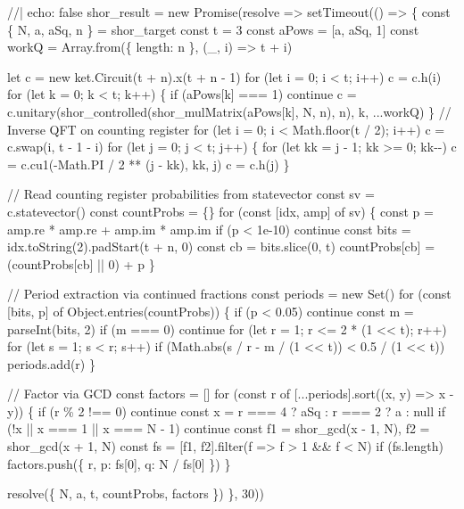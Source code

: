 \documentclass[
  11pt,
  letterpaper,
  oneside]{scrbook}
\newenvironment{Shaded}{\begin{snugshade}}{\end{snugshade}}
\newcommand{\NormalTok}[1]{\textcolor[rgb]{0.00,0.23,0.31}{#1}}
\begin{document}
\begin{Shaded}
\begin{Highlighting}[]
\NormalTok{//| echo: false}
\NormalTok{shor\_result = new Promise(resolve =\textgreater{} setTimeout(() =\textgreater{} \{}
\NormalTok{  const \{ N, a, aSq, n \} = shor\_target}
\NormalTok{  const t = 3}
\NormalTok{  const aPows = [a, aSq, 1]}
\NormalTok{  const workQ = Array.from(\{ length: n \}, (\_, i) =\textgreater{} t + i)}

\NormalTok{  let c = new ket.Circuit(t + n).x(t + n {-} 1)}
\NormalTok{  for (let i = 0; i \textless{} t; i++) c = c.h(i)}
\NormalTok{  for (let k = 0; k \textless{} t; k++) \{}
\NormalTok{    if (aPows[k] === 1) continue}
\NormalTok{    c = c.unitary(shor\_controlled(shor\_mulMatrix(aPows[k], N, n), n), k, ...workQ)}
\NormalTok{  \}}
\NormalTok{  // Inverse QFT on counting register}
\NormalTok{  for (let i = 0; i \textless{} Math.floor(t / 2); i++) c = c.swap(i, t {-} 1 {-} i)}
\NormalTok{  for (let j = 0; j \textless{} t; j++) \{}
\NormalTok{    for (let kk = j {-} 1; kk \textgreater{}= 0; kk{-}{-}) c = c.cu1({-}Math.PI / 2 ** (j {-} kk), kk, j)}
\NormalTok{    c = c.h(j)}
\NormalTok{  \}}

\NormalTok{  // Read counting register probabilities from statevector}
\NormalTok{  const sv = c.statevector()}
\NormalTok{  const countProbs = \{\}}
\NormalTok{  for (const [idx, amp] of sv) \{}
\NormalTok{    const p = amp.re * amp.re + amp.im * amp.im}
\NormalTok{    if (p \textless{} 1e{-}10) continue}
\NormalTok{    const bits = idx.toString(2).padStart(t + n, \textquotesingle{}0\textquotesingle{})}
\NormalTok{    const cb = bits.slice(0, t)}
\NormalTok{    countProbs[cb] = (countProbs[cb] || 0) + p}
\NormalTok{  \}}

\NormalTok{  // Period extraction via continued fractions}
\NormalTok{  const periods = new Set()}
\NormalTok{  for (const [bits, p] of Object.entries(countProbs)) \{}
\NormalTok{    if (p \textless{} 0.05) continue}
\NormalTok{    const m = parseInt(bits, 2)}
\NormalTok{    if (m === 0) continue}
\NormalTok{    for (let r = 1; r \textless{}= 2 * (1 \textless{}\textless{} t); r++)}
\NormalTok{      for (let s = 1; s \textless{} r; s++)}
\NormalTok{        if (Math.abs(s / r {-} m / (1 \textless{}\textless{} t)) \textless{} 0.5 / (1 \textless{}\textless{} t)) periods.add(r)}
\NormalTok{  \}}

\NormalTok{  // Factor via GCD}
\NormalTok{  const factors = []}
\NormalTok{  for (const r of [...periods].sort((x, y) =\textgreater{} x {-} y)) \{}
\NormalTok{    if (r \% 2 !== 0) continue}
\NormalTok{    const x = r === 4 ? aSq : r === 2 ? a : null}
\NormalTok{    if (!x || x === 1 || x === N {-} 1) continue}
\NormalTok{    const f1 = shor\_gcd(x {-} 1, N), f2 = shor\_gcd(x + 1, N)}
\NormalTok{    const fs = [f1, f2].filter(f =\textgreater{} f \textgreater{} 1 \&\& f \textless{} N)}
\NormalTok{    if (fs.length) factors.push(\{ r, p: fs[0], q: N / fs[0] \})}
\NormalTok{  \}}

\NormalTok{  resolve(\{ N, a, t, countProbs, factors \})}
\NormalTok{\}, 30))}
\end{Highlighting}
\end{Shaded}
\end{document}
